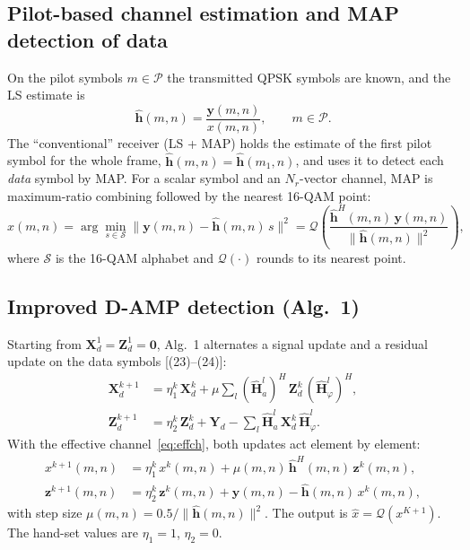 \documentclass[11pt,a4paper]{article}
\newcommand{\BH}{\mathbf{H}}
\newcommand{\BX}{\mathbf{X}}
\newcommand{\BY}{\mathbf{Y}}
\newcommand{\BZ}{\mathbf{Z}}
\begin{document}
\subsection{Pilot-based channel estimation and MAP detection of data}
On the pilot symbols $m\in\mathcal{P}$ the transmitted QPSK symbols are known, and the LS estimate is
\begin{equation}
  \hat{\mathbf{h}}(m,n)=\frac{\mathbf{y}(m,n)}{x(m,n)},\qquad m\in\mathcal{P}.
\label{eq:ls}
\end{equation}
The ``conventional'' receiver (LS + MAP) holds the estimate of the first pilot symbol for the whole frame, $\hat{\mathbf{h}}(m,n)=\hat{\mathbf{h}}(m_1,n)$, and uses it to detect each \emph{data} symbol by MAP. For a scalar symbol and an $N_r$-vector channel, MAP is maximum-ratio combining followed by the nearest 16-QAM point:
\begin{equation}
  \hat{x}(m,n)=\arg\min_{s\in\mathcal{S}}\big\|\mathbf{y}(m,n)-\hat{\mathbf{h}}(m,n)\,s\big\|^2
  =\mathcal{Q}\!\left(\frac{\hat{\mathbf{h}}^H(m,n)\,\mathbf{y}(m,n)}{\|\hat{\mathbf{h}}(m,n)\|^2}\right),
\label{eq:map}
\end{equation}
where $\mathcal{S}$ is the 16-QAM alphabet and $\mathcal{Q}(\cdot)$ rounds to its nearest point.

\subsection{Improved D-AMP detection (Alg.~1)}
Starting from $\BX_d^1=\BZ_d^1=\mathbf{0}$, Alg.~1 alternates a signal update and a residual update on the data symbols [(23)--(24)]:
\begin{align}
  \BX_d^{k+1}&=\eta_1^k\,\BX_d^k+\mu\sum_{l}(\hat{\BH}_a^l)^H\,\BZ_d^k\,(\hat{\BH}_\varphi^l)^H,\label{eq:damp1}\\
  \BZ_d^{k+1}&=\eta_2^k\,\BZ_d^k+\BY_d-\sum_{l}\hat{\BH}_a^l\,\BX_d^k\,\hat{\BH}_\varphi^l.\label{eq:damp2}
\end{align}
With the effective channel~\eqref{eq:effch}, both updates act element by element:
\begin{equation}
\begin{aligned}
  x^{k+1}(m,n)&=\eta_1^k\,x^k(m,n)+\mu(m,n)\,\hat{\mathbf{h}}^H(m,n)\,\mathbf{z}^k(m,n),\\
  \mathbf{z}^{k+1}(m,n)&=\eta_2^k\,\mathbf{z}^k(m,n)+\mathbf{y}(m,n)-\hat{\mathbf{h}}(m,n)\,x^k(m,n),
\end{aligned}
\label{eq:dampre}
\end{equation}
with step size $\mu(m,n)=0.5/\|\hat{\mathbf{h}}(m,n)\|^2$. The output is $\hat{x}=\mathcal{Q}(x^{K+1})$. The hand-set values are $\eta_1=1$, $\eta_2=0$.
\end{document}
